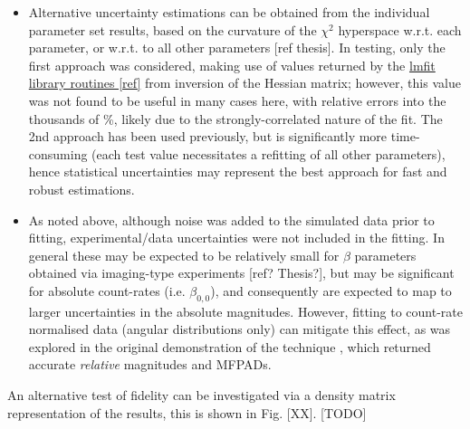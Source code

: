 \begin{itemize}
\item Alternative uncertainty estimations can be obtained from the individual parameter set results, based on the curvature of the $\chi^2$ hyperspace w.r.t. each parameter, or w.r.t. to all other parameters [ref thesis]. In testing, only the first approach was considered, making use of values returned by the \href{https://lmfit.github.io/lmfit-py/fitting.html#uncertainties-in-variable-parameters-and-their-correlations}{lmfit library routines [ref]} from inversion of the Hessian matrix; however, this value was not found to be useful in many cases here, with relative errors into the thousands of \%, likely due to the strongly-correlated nature of the fit. The 2nd approach has been used previously, but is significantly more time-consuming (each test value necessitates a refitting of all other parameters), hence statistical uncertainties may represent the best approach for fast and robust estimations.
\item As noted above, although noise was added to the simulated data prior to fitting, experimental/data uncertainties were not included in the fitting. In general these may be expected to be relatively small for $\beta$ parameters obtained via imaging-type experiments [ref? Thesis?], but may be significant for absolute count-rates (i.e. $\beta_{0,0}$), and consequently are expected to map to larger uncertainties in the absolute magnitudes. However, fitting to count-rate normalised data (angular distributions only) can mitigate this effect, as was explored in the original demonstration of the technique \cite{marceau2017MolecularFrameReconstruction}, which returned accurate \textit{relative} magnitudes and MFPADs.
\end{itemize}

An alternative test of fidelity can be investigated via a density matrix representation of the results, this is shown in Fig. [XX]. [TODO]







